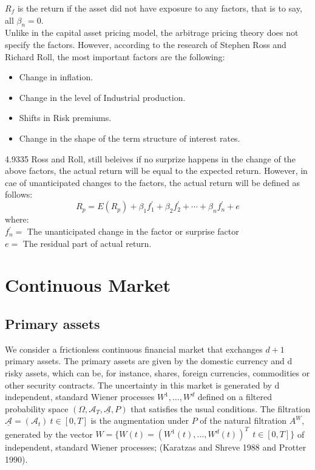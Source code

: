 \documentclass[a4 paper, 12pt]{report}
\theoremstyle{plain}
\begin{document}
$R_f$ is the return if the asset did not have exposure to any factors, that is to say, all $\beta_n = 0$.\\
Unlike in the capital asset pricing model, the arbitrage pricing theory does not specify the factors. However, according to the research of Stephen Ross and Richard Roll, the most important factors are the following:
\begin{itemize}
\item Change in inflation.
\item Change in the level of Industrial production.
\item Shifts in Risk premiums.
\item Change in the shape of the term structure of interest rates.
\end{itemize}4.9335
Ross and Roll, still beleives if no surprize happens in the change of the above factors, the actual return will be equal to the expected return. However, in cae of unanticipated changes to the factors, the actual return will be defined as follows:
$$
R_p = E(R_p) + \beta_1f_1^\prime+\beta_2f_2^\prime +\cdots + \beta_nf_n^\prime +e
$$
where:\\
$f_n^\prime = $ The unanticipated change in the factor or surprise factor\\
$e = $ The residual part of actual return.


\section{Continuous Market}
\subsection{Primary assets}
We consider a frictionless continuous financial market that
exchanges $d + 1$ primary assets. The primary assets are given by the domestic currency
and d risky assets, which can be, for instance, shares, foreign currencies, commodities or
other security contracts. The uncertainty in this market is generated by d independent, standard Wiener processes $W^1,\ldots,W^d$ defined on a filtered probability space $(\Omega,\mathcal{A}_T,\underline{\mathcal{A}}, P )$
that satisfies the usual conditions. The filtration $\underline{\mathcal{A}} = (\mathcal{A}_t)~{t\in [0,T]}$ is the
augmentation under $P$ of the natural filtration $A^W$, generated by the vector $W= \{W(t) = (W^1(t),\ldots, W^d(t))^T~~ t \in [0, T ]\}$ of independent, standard Wiener processes; (Karatzas and
Shreve 1988 and Protter 1990).
\end{document}
